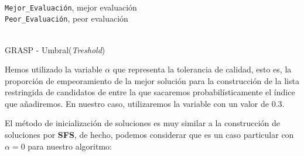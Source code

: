 \documentclass[a4paper, 11pt]{article}
\begin{document}
			\begin{algorithm}[H]
				\begin{algorithmic}[1]
					\REQUIRE \ \\
						\texttt{Mejor\_Evaluación}, mejor evaluación \\
						\texttt{Peor\_Evaluación}, peor evaluación \\ \
						
				\end{algorithmic}
			\caption{GRASP - Umbral(\textit{Treshold})}
			\label{Treshold}
			\end{algorithm}
			
			Hemos utilizado la variable $\alpha$ que representa la tolerancia de calidad, esto es, la
			proporción de empeoramiento de la mejor solución para la construcción de la lista restringida
			de candidatos de entre la que sacaremos probabilísticamente el índice que añadiremos. En
			nuestro caso, utilizaremos la variable con un valor de $0.3$.
			
			El método de inicialización de soluciones es muy similar a la construcción de soluciones por
			\textbf{SFS}, de hecho, podemos considerar que es un caso particular con $\alpha = 0$ para
			nuestro algoritmo:
\end{document}
